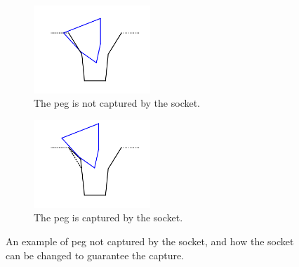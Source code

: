 \documentclass[11pt, twocolumn]{article}
\begin{document}

\begin{figure}[t]
\begin{center}
\begin{subfigure}[t]{0.24\textwidth}
\begin{center}
\includegraphics[height=1.3in]{figures/not_capture.png}
\end{center}
\caption{The peg is not captured by the socket. }
\label{fig:not_capture}
\end{subfigure}
\begin{subfigure}[t]{0.24\textwidth}
\begin{center}
\includegraphics[height=1.3in]{figures/captured.png}
\end{center}
\caption{The peg is captured by the socket.}
\label{fig:captured}
\end{subfigure}
\caption{An example of peg not captured by the socket, and how the socket can be changed to guarantee the capture. }
\label{fig:capture}
\end{center}
\end{figure}
\end{document}
